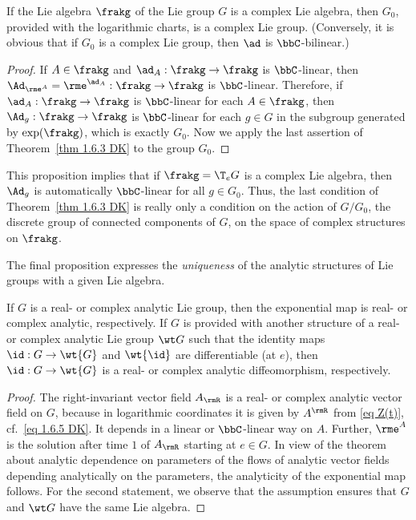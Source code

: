 \begin{prop}[{{\cite[Prop.~1.9.4]{DK}}}]
    If the Lie algebra $\frakg$ of the Lie group $G$ is a complex Lie algebra, then $G_0$, provided with the logarithmic charts, is a complex Lie group. (Conversely, it is obvious that if $G_0$ is a complex Lie group, then $\ad$ is $\bbC$-bilinear.)
\end{prop}
\begin{proof}
    If $A\in\frakg$ and $\ad_A:\frakg\to \frakg$ is $\bbC$-linear, then $\Ad_{\rme^A}=\rme^{\ad_A}:\frakg\to\frakg$ is $\bbC$-linear. Therefore, if $\ad_A:\frakg\to\frakg$ is $\bbC$-linear for each $A\in\frakg$, then $\Ad_g:\frakg\to\frakg$ is $\bbC$-linear for each $g\in G$ in the subgroup generated by $\exp(\frakg)$, which is exactly $G_0$. Now we apply the last assertion of Theorem~\ref{thm 1.6.3 DK} to the group $G_0$.
\end{proof}

This proposition implies that if $\frakg=\T_e G$ is a complex Lie algebra, then $\Ad_g$ is automatically $\bbC$-linear for all $g\in G_0$. Thus, the last condition of Theorem~\ref{thm 1.6.3 DK} is really only a condition on the action of $G\slash G_0$, the discrete group of connected components of $G$, on the space of complex structures on $\frakg$.

The final proposition expresses the \emph{uniqueness} of the analytic structures of Lie groups with a given Lie algebra.

\begin{prop}[{{\cite[Prop.~1.6.4]{DK}}}]
    If $G$ is a real- or complex analytic Lie group, then the exponential map is real- or complex analytic, respectively. If $G$ is provided with another structure of a real- or complex analytic Lie group $\wt G$ such that the identity maps $\id:G\to \wt{G}$ and $\wt{\id}$ are differentiable (at $e$), then $\id:G\to \wt{G}$ is a real- or complex analytic diffeomorphism, respectively.
\end{prop}
\begin{proof}
    The right-invariant vector field $A_\rmR$ is a real- or complex analytic vector field on $G$, because in logarithmic coordinates it is given by $A^\rmR$ from \eqref{eq Z(t)}, cf.\ \eqref{eq 1.6.5 DK}. It depends in a linear or $\bbC$-linear way on $A$. Further, $\rme^A$ is the solution after time $1$ of $A_\rmR$ starting at $e\in G$. In view of the theorem about analytic dependence on parameters of the flows of analytic vector fields depending analytically on the parameters, the analyticity of the exponential map follows. For the second statement, we observe that the assumption ensures that $G$ and $\wt G$ have the same Lie algebra.
\end{proof}



